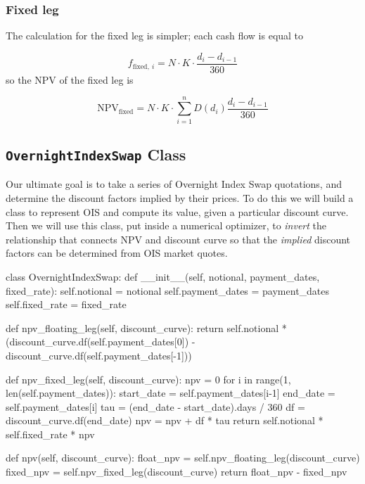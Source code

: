 \subsubsection{Fixed leg}\label{fixed-leg}

The calculation for the fixed leg is simpler; each cash flow is equal to

\begin{equation}
f_{\mathrm{fixed},~i}=N\cdot K\cdot \frac{d_i - d_{i-1}}{360}
\end{equation}
so the NPV of the fixed leg is

\begin{equation}
\mathrm{NPV}_{\mathrm{fixed}} = N\cdot K\cdot \sum_{i=1}^{n}D(d_{i})\frac{d_i - d_{i-1}}{360}
\end{equation}

\subsection{\texttt{OvernightIndexSwap} Class}\label{discount-factor-determination-from-market-quotes}

Our ultimate goal is to take a series of Overnight Index Swap
quotations, and determine the discount factors implied by their prices.
To do this we will build a class to represent OIS and compute its value,
given a particular discount curve. Then we will use this class, put inside
a numerical optimizer, to \emph{invert} the relationship that connects 
NPV and discount curve so that the \emph{implied} discount
factors can be determined from OIS market quotes.

\begin{ipython}
class OvernightIndexSwap:
    def __init__(self, notional, payment_dates, fixed_rate):
        self.notional = notional 
        self.payment_dates = payment_dates
        self.fixed_rate = fixed_rate

    def npv_floating_leg(self, discount_curve):
        return self.notional * (discount_curve.df(self.payment_dates[0]) -
                                discount_curve.df(self.payment_dates[-1]))

    def npv_fixed_leg(self, discount_curve):
        npv = 0
        for i in range(1, len(self.payment_dates)):
            start_date = self.payment_dates[i-1]
            end_date = self.payment_dates[i]
            tau = (end_date - start_date).days / 360
            df = discount_curve.df(end_date)
            npv = npv + df * tau
        return self.notional * self.fixed_rate * npv

    def npv(self, discount_curve):
        float_npv = self.npv_floating_leg(discount_curve)
        fixed_npv = self.npv_fixed_leg(discount_curve)
        return float_npv - fixed_npv
\end{ipython}

